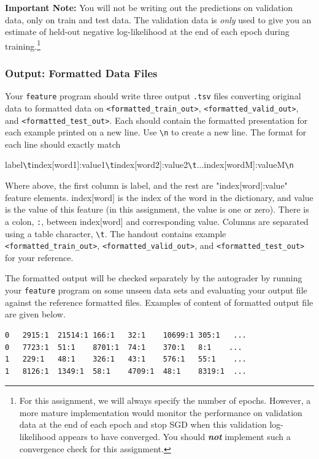 \begin{notebox}
{\bf Important Note:} You will not be writing out the predictions on validation data, only on train and test data. The validation data is \emph{only} used to give you an estimate of held-out negative log-likelihood at the end of each epoch during training.\footnote{For this assignment, we will always specify the number of epochs. However, a more mature implementation would monitor the performance on validation data at the end of each epoch and stop SGD when this validation log-likelihood appears to have converged. You should \textbf{ \emph{not}} implement such a convergence check for this assignment.} 
\end{notebox}


\subsubsection{Output: Formatted Data Files} \label{format_output}
Your \lstinline{feature} program should write three output \texttt{.tsv} files converting original data to formatted data on \texttt{<formatted\_train\_out>}, \texttt{<formatted\_valid\_out>}, and \texttt{<formatted\_test\_out>}. Each should contain the formatted presentation for each example printed on a new line. Use \lstinline{\n} to create a new line. The format for each line should exactly match 

label\lstinline{\t}index[word1]:value1\lstinline{\t}index[word2]:value2\lstinline{\t}...index[wordM]:valueM\lstinline{\n}

Where above, the first column is label, and the rest are "index[word]:value" feature elements. index[word] is the index of the word in the dictionary, and value is the value of this feature (in this assignment, the value is one or zero). There is a colon, \lstinline{:}, between index[word] and corresponding value. Columns are separated using a table character, \lstinline{\t}. The handout contains example \texttt{<formatted\_train\_out>}, \newline \texttt{<formatted\_valid\_out>}, and \texttt{<formatted\_test\_out>} for your reference.

The formatted output will be checked separately by the autograder by running your \lstinline{feature} program on some unseen data sets and evaluating your output file against the reference formatted files. Examples of content of formatted output file are given below.

\begin{lstlisting}
0	2915:1	21514:1	166:1	32:1	10699:1	305:1	...
0	7723:1	51:1	8701:1	74:1	370:1	8:1    ...
1	229:1	48:1	326:1	43:1	576:1	55:1	...
1	8126:1	1349:1	58:1	4709:1	48:1	8319:1	...
\end{lstlisting}


